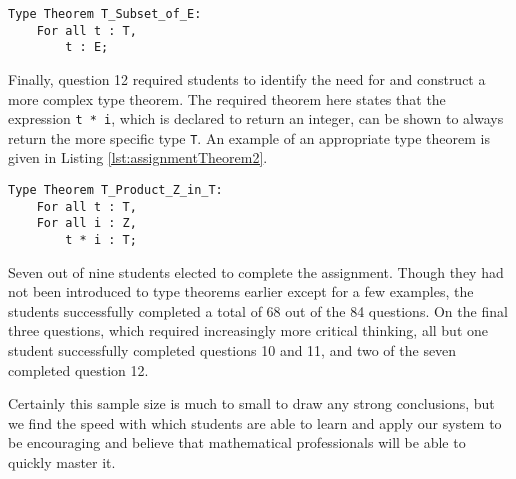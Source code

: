 \begin{lstlisting}[float=h,language=resolve,caption={A type theorem stating that \texttt{T} is a subset of \texttt{E}\label{lst:assignmentTheorem1}}]
Type Theorem T_Subset_of_E:
	For all t : T,
		t : E;
\end{lstlisting}

Finally, question 12 required students to identify the need for and construct a more complex type theorem.  The required theorem here states that the expression \texttt{t~*~i}, which is declared to return an integer, can be shown to always return the more specific type \texttt{T}.  An example of an appropriate type theorem is given in Listing \ref{lst:assignmentTheorem2}.

\begin{lstlisting}[float=h,language=resolve,caption={A type theorem stating that \texttt{t~*~i} returns a \texttt{T}\label{lst:assignmentTheorem2}}]
Type Theorem T_Product_Z_in_T:
	For all t : T,
	For all i : Z,
		t * i : T;
\end{lstlisting}

Seven out of nine students elected to complete the assignment.  Though they had not been introduced to type theorems earlier except for a few examples, the students successfully completed a total of 68 out of the 84 questions.  On the final three questions, which required increasingly more critical thinking, all but one student successfully completed questions 10 and 11, and two of the seven completed question 12.

Certainly this sample size is much to small to draw any strong conclusions, but we find the speed with which students are able to learn and apply our system to be encouraging and believe that mathematical professionals will be able to quickly master it.
